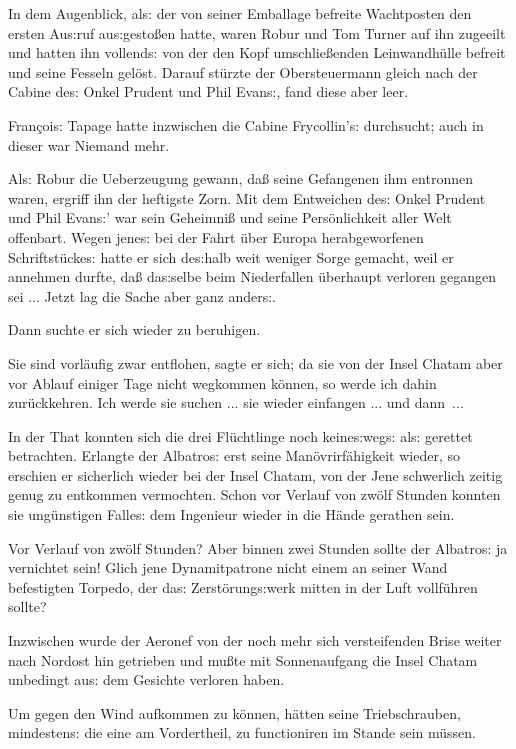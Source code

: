\documentclass[oneside,12pt]{book}
\newcommand{\s}{s:}
\begin{document}
In dem Augenblick, al{\s} der von seiner Emballage befreite
Wachtposten den ersten Au{\s}ruf au{\s}gesto{\ss}en hatte, waren
Robur und Tom Turner auf ihn zugeeilt und hatten ihn vollend{\s} von
der den Kopf umschlie{\ss}enden Leinwandh\"ulle befreit und seine
Fesseln gel\"ost. Darauf st\"urzte der Obersteuermann gleich nach der
Cabine de{\s} Onkel Prudent und Phil Evan{\s}, fand diese aber leer.

Fran\c{c}oi{\s} Tapage hatte inzwischen die Cabine Frycollin'{\s}
durchsucht; auch in dieser war Niemand mehr.

Al{\s} Robur die Ueberzeugung gewann, da{\ss} seine Gefangenen ihm
entronnen waren, ergriff ihn der heftigste Zorn. Mit dem Entweichen
de{\s} Onkel Prudent und Phil Evan{\s}' war sein Geheimni{\ss} und
seine Pers\"onlichkeit aller Welt offenbart. Wegen jene{\s} bei der
Fahrt \"uber Europa herabgeworfenen Schriftst\"ucke{\s} hatte er sich
de{\s}halb weit weniger Sorge gemacht, weil er annehmen durfte,
da{\ss} da{\s}selbe beim Niederfallen \"uberhaupt verloren gegangen
sei ... Jetzt lag die Sache aber ganz ander{\s}.

Dann suchte er sich wieder zu beruhigen.

{\glqq}Sie sind vorl\"aufig zwar entflohen, sagte er sich; da sie von
der Insel Chatam aber vor Ablauf einiger Tage nicht wegkommen
k\"onnen, so werde ich dahin zur\"uckkehren. Ich werde sie suchen ...
sie wieder einfangen ... und dann~...{\grqq}

In der That konnten sich die drei Fl\"uchtlinge noch keine{\s}weg{\s}
al{\s} gerettet betrachten. Erlangte der {\glqq}Albatro{\s}{\grqq}
erst seine Man\"ovrirf\"ahigkeit wieder, so erschien er sicherlich
wieder bei der Insel Chatam, von der Jene schwerlich zeitig genug zu
entkommen vermochten. Schon vor Verlauf von zw\"olf Stunden konnten
sie ung\"unstigen Falle{\s} dem Ingenieur wieder in die H\"ande
gerathen sein.

Vor Verlauf von zw\"olf Stunden? Aber binnen zwei Stunden sollte der
{\glqq}Albatro{\s}{\grqq} ja vernichtet sein! Glich jene
Dynamitpatrone nicht einem an seiner Wand befestigten Torpedo, der
da{\s} Zerst\"orung{\s}werk mitten in der Luft vollf\"uhren sollte?

Inzwischen wurde der Aeronef von der noch mehr sich versteifenden
Brise weiter nach Nordost hin getrieben und mu{\ss}te mit
Sonnenaufgang die Insel Chatam unbedingt au{\s} dem Gesichte verloren
haben.

Um gegen den Wind aufkommen zu k\"onnen, h\"atten seine
Triebschrauben, mindesten{\s} die eine am Vordertheil, zu
functioniren im Stande sein m\"ussen.
\end{document}
